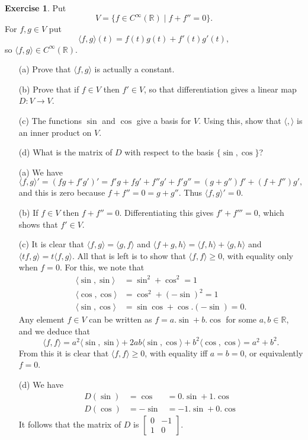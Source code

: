 \documentclass{amsart}
\newcommand{\R}         {{\mathbb{R}}}
\newcommand{\bbm}       {\left[\begin{matrix}}
\newcommand{\ebm}       {\end{matrix}\right]}
\newcommand{\st}        {\;|\;}
\newcommand{\ip}[1]     {\langle #1\rangle}
\renewcommand{\:}       {\colon}
\theoremstyle{definition}
\newtheorem{exercise}{Exercise}[section]
\renewenvironment{solution}{\SolutionAtEnd}{\endSolutionAtEnd}
\begin{document}
\begin{exercise}
 Put
 \[ V = \{f\in C^\infty(\R)\st f+f''=0\}. \]
 For $f,g\in V$ put
 \[ \ip{f,g}(t) = f(t)g(t) + f'(t)g'(t), \]
 so $\ip{f,g}\in C^\infty(\R)$.
 \begin{itemize}
  \item[(a)] Prove that $\ip{f,g}$ is actually a constant.
  \item[(b)] Prove that if $f\in V$ then $f'\in V$, so that
  differentiation gives a linear map $D\:V\to V$.
  \item[(c)] The functions $\sin$ and $\cos$ give a basis for $V$.
   Using this, show that $\ip{,}$ is an inner product on $V$.
  \item[(d)] What is the matrix of $D$ with respect to the basis
  $\{\sin,\cos\}$?
 \end{itemize}
\end{exercise}
\begin{solution}
 \begin{itemize}
  \item[(a)] We have
   \[ \ip{f,g}'=(fg+f'g')'=f'g+fg'+f''g'+f'g''=
       (g+g'')f' + (f+f'')g',
   \]
   and this is zero because $f+f''=0=g+g''$.  Thus $\ip{f,g}'=0$.
  \item[(b)] If $f\in V$ then $f+f''=0$.  Differentiating this
  gives $f'+f'''=0$, which shows that $f'\in V$.
  \item[(c)] It is clear that $\ip{f,g}=\ip{g,f}$ and
   $\ip{f+g,h}=\ip{f,h}+\ip{g,h}$ and $\ip{tf,g}=t\ip{f,g}$.  All
   that is left is to show that $\ip{f,f}\geq 0$, with equality
   only when $f=0$.  For this, we note that
   \begin{align*}
    \ip{\sin,\sin} &= \sin^2 + \cos^2 = 1 \\
    \ip{\cos,\cos} &= \cos^2 + (-\sin)^2 = 1 \\
    \ip{\sin,\cos} &= \sin\cos + \cos.(-\sin) = 0.
   \end{align*}
   Any element $f\in V$ can be written as $f=a.\sin+b.\cos$ for
   some $a,b\in\R$, and we deduce that
   \[ \ip{f,f} =
       a^2\ip{\sin,\sin} + 2ab\ip{\sin,\cos} + b^2\ip{\cos,\cos}
       = a^2 + b^2.
   \]
   From this it is clear that $\ip{f,f}\geq 0$, with equality iff
   $a=b=0$, or equivalently $f=0$.
  \item[(d)]
   We have
   \begin{align*}
    D(\sin) &=  \cos &= 0.\sin + 1.\cos \\
    D(\cos) &= -\sin &= -1.\sin + 0.\cos
   \end{align*}
   It follows that the matrix of $D$ is $\bbm 0&-1\\1&0\ebm$.
 \end{itemize}
\end{solution}
\end{document}
